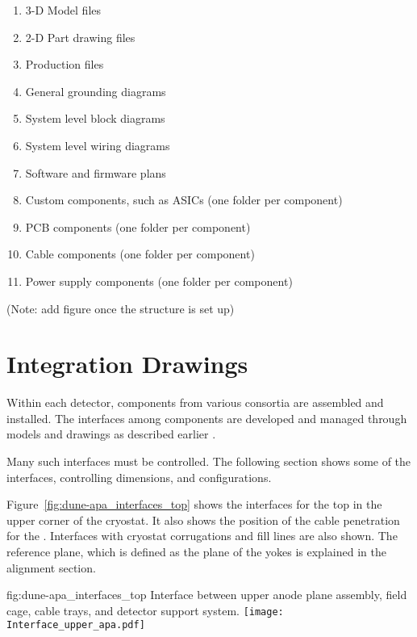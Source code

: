 \begin{enumerate}
 \begin{enumerate}
   \item 3-D Model files
   \item 2-D Part drawing files
   \item Production files
   \item General grounding diagrams
   \item System level block diagrams
   \item System level wiring diagrams
   \item Software and firmware plans
   \item Custom components, such as ASICs (one folder per component)
   \item PCB components (one folder per component)
   \item Cable components (one folder per component)
   \item Power supply components (one folder per component)
 \end{enumerate}
\end{enumerate}
(Note: add figure once the  structure is set up)






\section{Integration Drawings}
\label{sec:fdsp-coord-integ-drawings}
Within each detector, components from various consortia are assembled
and installed. The interfaces among components are developed and
managed through models and drawings as described earlier  .


Many such interfaces must be controlled. The following
section shows some of the interfaces, controlling dimensions, and
configurations.


Figure~\ref{fig:dune-apa_interfaces_top} shows the interfaces for the
top  in the upper corner of the cryostat. It also shows the position
of the cable penetration for the . Interfaces with cryostat
corrugations and  fill lines are also shown. The reference plane,
which is defined as the plane of the  yokes is explained in the
alignment section.
\begin{dunefigure}{fig:dune-apa_interfaces_top}
  {Interface between upper anode plane assembly, field cage, cable
    trays, and detector support system.}
  \texttt{[image: Interface\_upper\_apa.pdf]}
\end{dunefigure}


